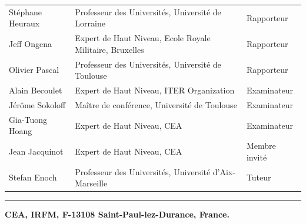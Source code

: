 \begin{tabular}{lll}
  Stéphane Heuraux & Professeur des Universit\'es,  Université de Lorraine  & Rapporteur\\
  \vspace{0.08cm}
  Jeff Ongena  & Expert de Haut Niveau, Ecole Royale Militaire, Bruxelles  & Rapporteur\\
  \vspace{0.08cm}
  Olivier Pascal & Professeur des Universit\'es,  Université de Toulouse & Rapporteur\\
  \vspace{0.08cm}
  Alain Becoulet & Expert de Haut Niveau, ITER Organization & Examinateur \\
  \vspace{0.08cm}
  Jérôme Sokoloff & Maître de conférence, Université de Toulouse & Examinateur \\ 
  \vspace{0.08cm}
  Gia-Tuong Hoang & Expert de Haut Niveau, CEA & Examinateur \\  
  \vspace{0.08cm}
  Jean Jacquinot & Expert de Haut Niveau, CEA & Membre invit\'e \\
  \vspace{0.08cm}
  Stefan Enoch & Professeur des Universit\'es, Universit\'e d'Aix-Marseille & Tuteur\\
  
\end{tabular}

\begin{center}
\vspace{0.2cm}
\hrule
\vspace{0.35cm}
\textbf{CEA, IRFM, F-13108 Saint-Paul-lez-Durance, France.}
\end{center}

